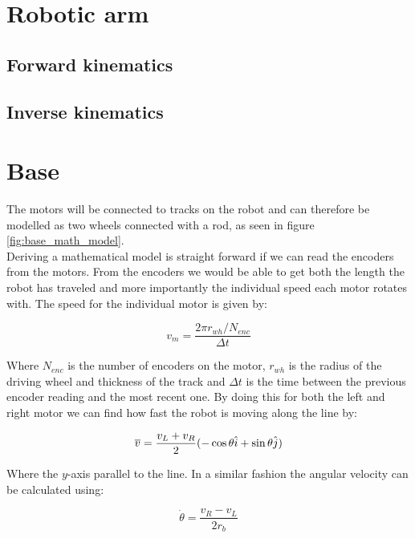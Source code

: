 \section*{Robotic arm}
\subsection*{Forward kinematics}
\subsection*{Inverse kinematics}



\section*{Base}

The motors will be connected to tracks on the robot and can therefore be modelled as two wheels connected with a rod, as seen in figure \ref{fig:base_math_model}.\\ 
Deriving a mathematical model is straight forward if we can read the encoders from the motors. From the encoders we would be able to get both the length the robot has traveled and more importantly the individual speed each motor rotates with. The speed for the individual motor is given by: 

\begin{equation}
    v_m=\frac{2\pi r_{wh}/N_{enc}}{\Delta t}
    \label{eq:base_system_eq1}
\end{equation}

\noindent Where $N_{enc}$ is the number of encoders on the motor, $r_{wh}$ is the radius of the driving wheel and thickness of the track and $\Delta t$ is the time between the previous encoder reading and the most recent one. By doing this for both the left and right motor we can find how fast the robot is moving along the line by:

\begin{equation}
    \overline{v}= \frac{v_L+v_R}{2}(-\cos \theta \hat{i}+ \sin \theta \Hat{j})
\end{equation}

\noindent Where the $y$-axis parallel to the line. In a similar fashion the angular velocity can be calculated using:

\begin{equation}
    \Dot{\theta} = \frac{v_R-v_L}{2r_{b}}
    \label{eq:base_system_eq2}
\end{equation}

